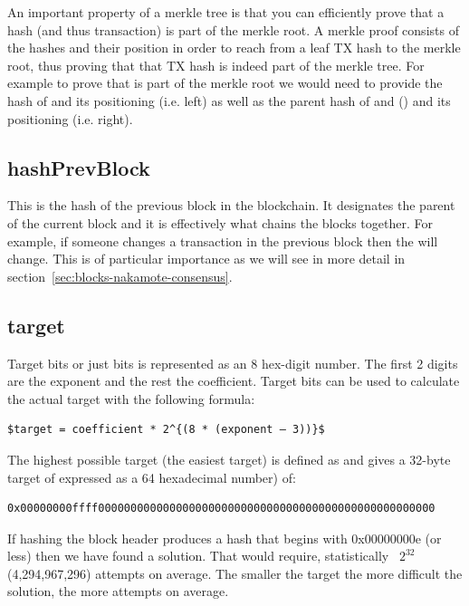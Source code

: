 An important property of a merkle tree is that you can efficiently prove that a hash (and thus transaction) is part of the merkle root. A merkle proof consists of the hashes and their position in order to reach from a leaf TX hash to the merkle root, thus proving that that TX hash is indeed part of the merkle tree. For example to prove that  is part of the merkle root we would need to provide the hash of  and its positioning (i.e. left) as well as the parent hash of  and  () and its positioning (i.e. right).

\subsection*{hashPrevBlock}
This is the hash of the previous block in the blockchain. It designates the parent of the current block and it is effectively what chains the blocks together. For example, if someone changes a transaction in the previous block then the  will change. This is of particular importance as we will see in more detail in section~\ref{sec:blocks-nakamote-consensus}.

\subsection*{target}
Target bits or just bits is represented as an 8 hex-digit number. The first 2 digits are the exponent and the rest the coefficient. Target bits can be used to calculate the actual target with the following formula:

\begin{emphbox}
\begin{lstlisting}[style=Pseudomath]
    $target = coefficient * 2^{(8 * (exponent – 3))}$
\end{lstlisting}
\end{emphbox}

The highest possible target (the easiest target) is defined as  and gives a 32-byte target of expressed as a 64 hexadecimal number) of:

\small
\begin{emphbox}
\begin{lstlisting}[style=Pseudomath]
0x00000000ffff0000000000000000000000000000000000000000000000000000
\end{lstlisting}
\end{emphbox}
\normalsize

If hashing the block header produces a hash that begins with 0x00000000e (or less) then we have found a solution. That would require, statistically ~$2^{32}$ (4,294,967,296) attempts on average. The smaller the target the more difficult the solution, the more attempts on average.

